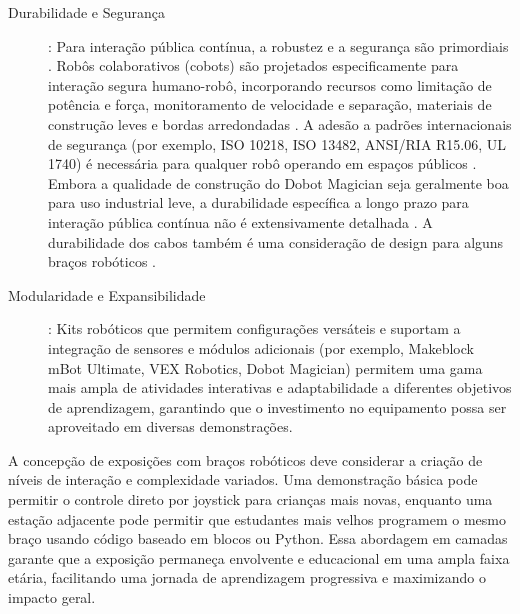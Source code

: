 \documentclass[%
  a4paper,%
  12pt,%
  fleqn,%
  english,%
  brazilian,%
]{article}
\begin{document}
\begin{description}
		\item [Durabilidade e Segurança]: Para interação pública contínua, a robustez e a segurança são primordiais \cite{ross2024BeyondExhibits}. Robôs colaborativos (cobots) são projetados especificamente para interação segura humano-robô, incorporando recursos como limitação de potência e força, monitoramento de velocidade e separação, materiais de construção leves e bordas arredondadas \cite{top3dshopDobotMagicianReview2023}. A adesão a padrões internacionais de segurança (por exemplo, ISO 10218, ISO 13482, ANSI/RIA R15.06, UL 1740) é necessária para qualquer robô operando em espaços públicos \cite{standardBotsCobotSafetyStandards2025}. Embora a qualidade de construção do Dobot Magician seja geralmente boa para uso industrial leve, a durabilidade específica a longo prazo para interação pública contínua não é extensivamente detalhada \cite{robotlabDobotClassroomPack2025}. A durabilidade dos cabos também é uma consideração de design para alguns braços robóticos \cite{bostonDynamicsSpot2025}.
		\item [Modularidade e Expansibilidade]: Kits robóticos que permitem configurações versáteis e suportam a integração de sensores e módulos adicionais (por exemplo, Makeblock mBot Ultimate, VEX Robotics, Dobot Magician) \cite{makeblockMBot22025} permitem uma gama mais ampla de atividades interativas e adaptabilidade a diferentes objetivos de aprendizagem, garantindo que o investimento no equipamento possa ser aproveitado em diversas demonstrações.
	\end{description}


A concepção de exposições com braços robóticos deve considerar a criação de níveis de interação e complexidade variados. Uma demonstração básica pode permitir o controle direto por joystick para crianças mais novas, enquanto uma estação adjacente pode permitir que estudantes mais velhos programem o mesmo braço usando código baseado em blocos ou Python. Essa abordagem em camadas garante que a exposição permaneça envolvente e educacional em uma ampla faixa etária, facilitando uma jornada de aprendizagem progressiva e maximizando o impacto geral.
\end{document}
